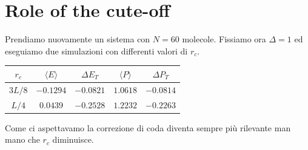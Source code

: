 \documentclass[a4paper,11pt]{article}
\begin{document}
\section*{Role of the cute-off}
\noindent Prendiamo nuovamente un sistema con $N=60$ molecole. Fissiamo ora $\Delta=1$ ed eseguiamo due simulazioni con differenti valori di $r_c$.
\begin{table}[H]
	\centering
	\begin{tabular}{ccccc} 
		\hline
		$r_c$ & $\langle E \rangle $ & $\Delta E_T$ & $ \langle P \rangle $ & $\Delta P_T$\\
		\hline
		$3L/8$	&	$-0.1294$	&	$-0.0821$	&	$1.0618$	&	$-0.0814$	\\
		$L/4$	&	$0.0439$	&	$-0.2528$	&	$1.2232$	&	$-0.2263$	\\\hline
	\end{tabular}
\end{table}
\medskip
\noindent Come ci aspettavamo la correzione di coda diventa sempre più rilevante man mano che $r_c$ diminuisce. 
\end{document}
